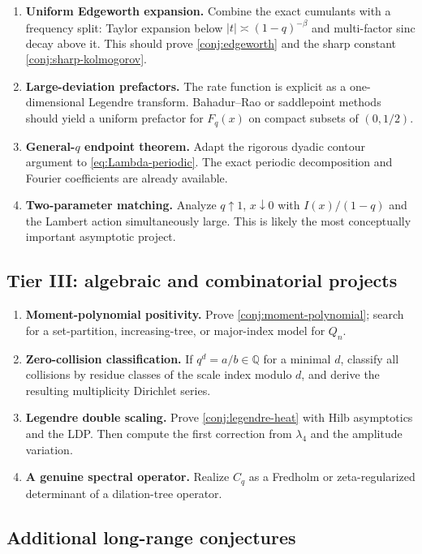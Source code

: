\documentclass[11pt]{article}
\theoremstyle{definition}
\theoremstyle{remark}
\begin{document}
\begin{enumerate}
  \item \textbf{Uniform Edgeworth expansion.}  Combine the exact cumulants with a frequency split: Taylor expansion below $|t|\asymp(1-q)^{-\beta}$ and multi-factor sinc decay above it.  This should prove \cref{conj:edgeworth} and the sharp constant \cref{conj:sharp-kolmogorov}.
  \item \textbf{Large-deviation prefactors.}  The rate function is explicit as a one-dimensional Legendre transform.  Bahadur--Rao or saddlepoint methods should yield a uniform prefactor for $F_q(x)$ on compact subsets of $(0,1/2)$.
  \item \textbf{General-$q$ endpoint theorem.}  Adapt the rigorous dyadic contour argument to \cref{eq:Lambda-periodic}.  The exact periodic decomposition and Fourier coefficients are already available.
  \item \textbf{Two-parameter matching.}  Analyze $q\uparrow1$, $x\downarrow0$ with $I(x)/(1-q)$ and the Lambert action simultaneously large.  This is likely the most conceptually important asymptotic project.
\end{enumerate}

\subsection{Tier III: algebraic and combinatorial projects}

\begin{enumerate}
  \item \textbf{Moment-polynomial positivity.}  Prove \cref{conj:moment-polynomial}; search for a set-partition, increasing-tree, or major-index model for $Q_n$.
  \item \textbf{Zero-collision classification.}  If $q^d=a/b\in\mathbb Q$ for a minimal $d$, classify all collisions by residue classes of the scale index modulo $d$, and derive the resulting multiplicity Dirichlet series.
  \item \textbf{Legendre double scaling.}  Prove \cref{conj:legendre-heat} with Hilb asymptotics and the LDP.  Then compute the first correction from $\lambda_4$ and the amplitude variation.
  \item \textbf{A genuine spectral operator.}  Realize $C_q$ as a Fredholm or zeta-regularized determinant of a dilation-tree operator.
\end{enumerate}

\subsection{Additional long-range conjectures}
\end{document}
